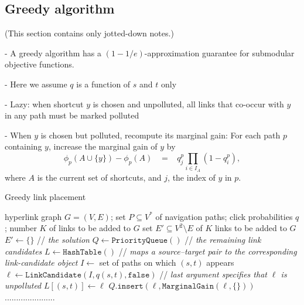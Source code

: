\documentclass[11pt,letterpaper]{article}
\begin{document}
\subsection{Greedy algorithm}

(This section contains only jotted-down notes.)

- A greedy algorithm has a $(1-1/e)$-approximation guarantee for submodular objective functions.

- Here we assume $q$ is a function of $s$ and $t$ only

- Lazy: when shortcut $y$ is chosen and unpolluted, all links that co-occur with $y$ in any path must be marked polluted

- When $y$ is chosen but polluted, recompute its marginal gain: For each path $p$ containing $y$, increase the marginal gain of $y$ by 
$$\phi_p(A \cup \{y\}) - \phi_p(A)
\;\;\;=\;\;\; q^p_j \prod_{i \in I_A} \left( 1 - q^p_i \right),$$
where $A$ is the current set of shortcuts, and $j$, the index of $y$ in $p$.

\begin{algorithm}[t]
\caption{Greedy link placement}
\begin{algorithmic}[1]
\label{alg:greedy}
\INPUT hyperlink graph $G=(V,E)$; set $P \subseteq V^*$ of navigation paths; click probabilities $q$; number $K$ of links to be added to $G$
\OUTPUT set $E' \subseteq V^2 \setminus E$ of $K$ links to be added to $G$
\STATE $E' \leftarrow \{\}$ \hspace*{1mm}// \textit{the solution}
\STATE $Q \leftarrow \mathtt{PriorityQueue()}$ \hspace*{1mm}// \textit{the remaining link candidates}
\STATE $L \leftarrow \mathtt{HashTable()}$ \hspace*{1mm}// \textit{maps a source--target pair to the corresponding link-candidate object}
  \STATE $I \leftarrow$ set of paths on which $(s,t)$ appears
  \STATE $\ell \leftarrow \mathtt{LinkCandidate}(I, q(s,t), \mathtt{false})$ \hspace*{1mm}// \textit{last argument specifies that $\ell$ is unpolluted}
  \STATE $L[(s,t)] \leftarrow \ell$
  \STATE $Q.\mathtt{insert}(\ell, \mathtt{MarginalGain}(\ell, \{\}))$
\ENDFOR
{}
  	\STATE ......................
  \ENDWHILE
\ENDFOR
\end{algorithmic}
\end{algorithm}
\end{document}
